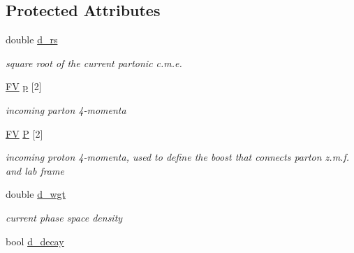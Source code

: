 \subsection*{Protected Attributes}
\begin{DoxyCompactItemize}
\item 
\hypertarget{classPS__2_a20ee7f6afb71183f2f61c7049b2e1c9e}{}double \hyperlink{classPS__2_a20ee7f6afb71183f2f61c7049b2e1c9e}{d\+\_\+rs}\label{classPS__2_a20ee7f6afb71183f2f61c7049b2e1c9e}

\begin{DoxyCompactList}\small\item\em square root of the current partonic c.\+m.\+e. \end{DoxyCompactList}\item 
\hypertarget{classPS__2_ac717630d614c3bce592b1d0ba1d969c7}{}\hyperlink{classFV}{F\+V} \hyperlink{classPS__2_ac717630d614c3bce592b1d0ba1d969c7}{p} \mbox{[}2\mbox{]}\label{classPS__2_ac717630d614c3bce592b1d0ba1d969c7}

\begin{DoxyCompactList}\small\item\em incoming parton 4-\/momenta \end{DoxyCompactList}\item 
\hypertarget{classPS__2_a9c8c1bd53ef9086e96705be1377564ec}{}\hyperlink{classFV}{F\+V} \hyperlink{classPS__2_a9c8c1bd53ef9086e96705be1377564ec}{P} \mbox{[}2\mbox{]}\label{classPS__2_a9c8c1bd53ef9086e96705be1377564ec}

\begin{DoxyCompactList}\small\item\em incoming proton 4-\/momenta, used to define the boost that connects parton z.\+m.\+f. and lab frame \end{DoxyCompactList}\item 
\hypertarget{classPS__2_a7840687732819d92810f9a2666621650}{}double \hyperlink{classPS__2_a7840687732819d92810f9a2666621650}{d\+\_\+wgt}\label{classPS__2_a7840687732819d92810f9a2666621650}

\begin{DoxyCompactList}\small\item\em current phase space density \end{DoxyCompactList}\item 
\hypertarget{classPS__2_a973be656af67bb3516424e664a49ae55}{}bool \hyperlink{classPS__2_a973be656af67bb3516424e664a49ae55}{d\+\_\+decay}\label{classPS__2_a973be656af67bb3516424e664a49ae55}


\end{DoxyCompactItemize}
